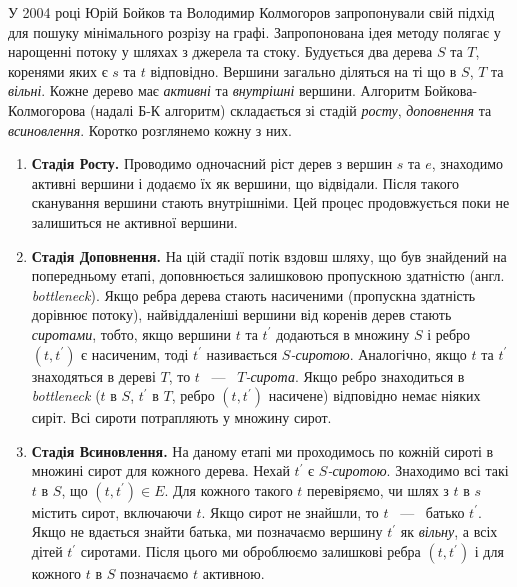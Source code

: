 У 2004 році Юрій Бойков та Володимир Колмогоров запропонували свій підхід \cite{boykov_kolmogorov}
для пошуку мінімального розрізу на графі.
Запропонована ідея методу полягає у нарощенні потоку у шляхах з джерела та стоку.
Будується два дерева $S$ та $T$, коренями яких є $s$ та $t$ відповідно.
Вершини загально діляться на ті що в $S$, $T$ та
\textit{вільні}. Кожне дерево має \textit{активні} та \textit{внутрішні} вершини.
Алгоритм Бойкова-Колмогорова (надалі Б-К алгоритм) складається зі стадій \textit{росту},
\textit{доповнення} та \textit{всиновлення}.
Коротко розглянемо кожну з них.
\begin{enumerate}
    \item \textbf{Стадія Росту.}
          Проводимо одночасний ріст дерев з вершин $s$ та $e$, знаходимо активні
          вершини і додаємо їх як вершини, що відвідали. Після такого сканування вершини
          стають внутрішніми. Цей процес продовжується поки не залишиться не активної вершини.
    \item \textbf{Стадія Доповнення.}
          На цій стадії потік вздовш шляху, що був знайдений на попередньому етапі,
          доповнюється залишковою пропускною здатністю (англ. \textit{bottleneck}). Якщо ребра дерева стають
          насиченими (пропускна здатність дорівнює потоку), найвіддаленіші вершини від коренів дерев стають
          \textit{сиротами}, тобто, якщо вершини $t$ та $t^{'}$ додаються в множину $S$
          і ребро $(t,t^{'})$ є насиченим, тоді $t^{'}$ називається \textit{$S$-сиротою}.
          Аналогічно, якщо $t$ та $t^{'}$ знаходяться в дереві $T$, то  $t$ ~---~ \textit{$T$-сирота}.
          Якщо ребро знаходиться в \textit{bottleneck} ($t$ в $S$, $t^{'}$ в $T$, ребро $(t,t^{'})$
          насичене) відповідно немає ніяких сиріт. Всі сироти потрапляють у множину сирот.
    \item \textbf{Стадія Всиновлення.}
          На даному етапі ми проходимось по кожній сироті в множині сирот для кожного дерева.
          Нехай $t^{'}$ є \textit{$S$-сиротою}. Знаходимо всі такі $t$  в $S$, що
          $(t, t^{'}) \in E$. Для кожного такого $t$ перевіряємо, чи шлях з $t$ в $s$ містить сирот,
          включаючи $t$. Якщо сирот не знайшли, то $t$ ~---~ батько  $t^{'}$.
          Якщо не вдається знайти батька, ми позначаємо вершину $t^{'}$ як \textit{вільну}, а всіх
          дітей $t^{'}$ сиротами. Після цього ми оброблюємо залишкові ребра $(t,t^{'})$ і для кожного $t$ в $S$ позначаємо
          $t$ активною.
\end{enumerate}

